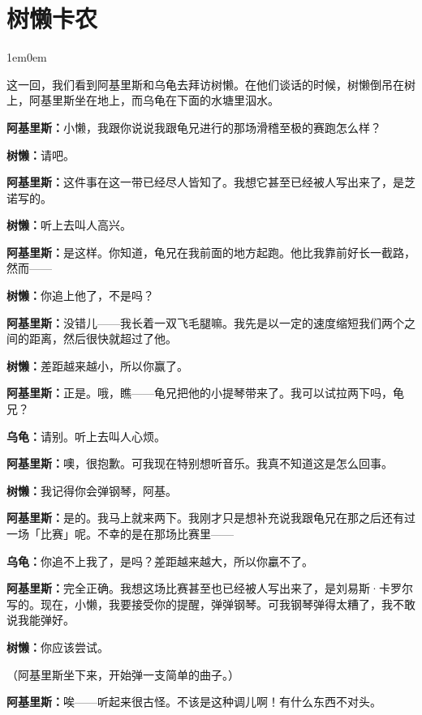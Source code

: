 \documentclass[
  12pt,
  twoside,
  openright,
  oldfontcommands,
]{memoir}
\newcommand{\dialogname}[1]{{\heifamily\bfseries #1}}
\newenvironment{dialogguide}{%
  \begin{adjustwidth}{1em}{0em}\kaitifamily\itshape\small%
}{%
  \end{adjustwidth}%
}
\begin{document}
\mainmatter
\setcounter{chapter}{18}
\markboth{}{}

\chapter*{树懒卡农}

\begin{dialogguide}
这一回，我们看到阿基里斯和乌龟去拜访树懒。在他们谈话的时候，树懒倒吊在树上，阿基里斯坐在地上，而乌龟在下面的水塘里泅水。
\end{dialogguide}

\dialogname{阿基里斯：}小懒，我跟你说说我跟龟兄进行的那场滑稽至极的赛跑怎么样？

\dialogname{树懒：}请吧。

\dialogname{阿基里斯：}这件事在这一带已经尽人皆知了。我想它甚至已经被人写出来了，是芝诺写的。

\dialogname{树懒：}听上去叫人高兴。

\dialogname{阿基里斯：}是这样。你知道，龟兄在我前面的地方起跑。他比我靠前好长一截路，然而------

\dialogname{树懒：}你追上他了，不是吗？

\dialogname{阿基里斯：}没错儿------我长着一双飞毛腿嘛。我先是以一定的速度缩短我们两个之间的距离，然后很快就超过了他。

\dialogname{树懒：}差距越来越小，所以你赢了。

\dialogname{阿基里斯：}正是。哦，瞧------龟兄把他的小提琴带来了。我可以试拉两下吗，龟兄？

\dialogname{乌龟：}请别。听上去叫人心烦。

\dialogname{阿基里斯：}噢，很抱歉。可我现在特别想听音乐。我真不知道这是怎么回事。

\dialogname{树懒：}我记得你会弹钢琴，阿基。

\dialogname{阿基里斯：}是的。我马上就来两下。我刚才只是想补充说我跟龟兄在那之后还有过一场「比赛」呢。不幸的是在那场比赛里------

\dialogname{乌龟：}你追不上我了，是吗？差距越来越大，所以你臝不了。

\dialogname{阿基里斯：}完全正确。我想这场比赛甚至也已经被人写出来了，是刘易斯·卡罗尔写的。现在，小懒，我要接受你的提醒，弹弹钢琴。可我钢琴弹得太糟了，我不敢说我能弹好。

\dialogname{树懒：}你应该尝试。

（阿基里斯坐下来，开始弹一支简单的曲子。）

\dialogname{阿基里斯：}唉------听起来很古怪。不该是这种调儿啊！有什么东西不对头。
\end{document}
